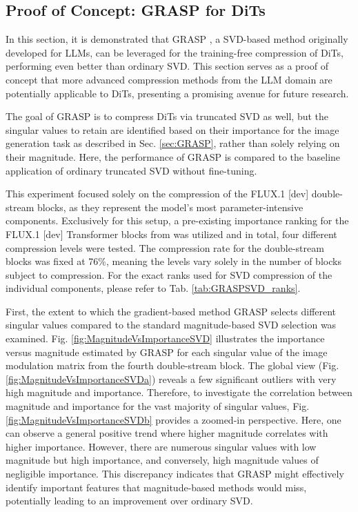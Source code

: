 \subsection{Proof of Concept: GRASP for DiTs}
\label{sec:GRASPForDiTs}
In this section, it is demonstrated that \gls{GRASP} \cite{GRASP}, a \gls{SVD}-based method originally developed for \gls{LLM}s, can be leveraged for the training-free compression of \gls{DiT}s, performing even better than ordinary \gls{SVD}. This section serves as a proof of concept that more advanced compression methods from the \gls{LLM} domain are potentially applicable to \gls{DiT}s, presenting a promising avenue for future research. 

 The goal of \gls{GRASP} is to compress \gls{DiT}s via truncated \gls{SVD} as well, but the singular values to retain are identified based on their importance for the image generation task as described in Sec. \ref{sec:GRASP}, rather than solely relying on their magnitude. Here, the performance of \gls{GRASP} is compared to the baseline application of ordinary truncated \gls{SVD} without fine-tuning.
 

This experiment focused solely on the compression of the FLUX.1 {[dev]} double-stream blocks, as they represent the model's most parameter-intensive components. Exclusively for this setup, a pre-existing importance ranking for the FLUX.1 {[dev]} Transformer blocks from \cite{FastFlux} was utilized and in total, four different compression levels were tested. The compression rate for the double-stream blocks was fixed at 76\%, meaning the levels vary solely in the number of blocks subject to compression. For the exact ranks used for \gls{SVD} compression of the individual components, please refer to Tab. \ref{tab:GRASPSVD_ranks}. 

First, the extent to which the gradient-based method \gls{GRASP} selects different singular values compared to the standard magnitude-based \gls{SVD} selection was examined. Fig. \ref{fig:MagnitudeVsImportanceSVD} illustrates the importance versus magnitude estimated by \gls{GRASP} for each singular value of the image modulation matrix from the fourth double-stream block. The global view (Fig. \ref{fig:MagnitudeVsImportanceSVDa}) reveals a few significant outliers with very high magnitude and importance. Therefore, to investigate the correlation between magnitude and importance for the vast majority of singular values, Fig. \ref{fig:MagnitudeVsImportanceSVDb} provides a zoomed-in perspective. Here, one can observe a general positive trend where higher magnitude correlates with higher importance. However, there are numerous singular values with low magnitude but high importance, and conversely, high magnitude values of negligible importance. This discrepancy indicates that \gls{GRASP} might effectively identify important features that magnitude-based methods would miss, potentially leading to an improvement over ordinary \gls{SVD}.




